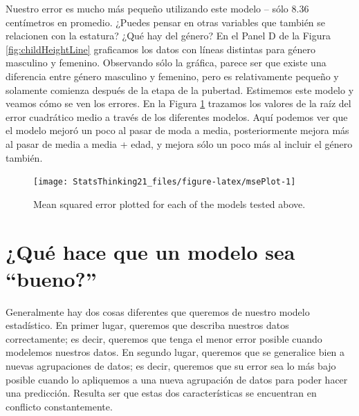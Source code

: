 \documentclass[
  12pt,
]{book}
\begin{document}
Nuestro error es mucho más pequeño utilizando este modelo -- sólo 8.36 centímetros en promedio. ¿Puedes pensar en otras variables que también se relacionen con la estatura? ¿Qué hay del género? En el Panel D de la Figura \ref{fig:childHeightLine} graficamos los datos con líneas distintas para género masculino y femenino. Observando sólo la gráfica, parece ser que existe una diferencia entre género masculino y femenino, pero es relativamente pequeño y solamente comienza después de la etapa de la pubertad. Estimemos este modelo y veamos cómo se ven los errores. En la Figura \ref{fig:msePlot} trazamos los valores de la raíz del error cuadrático medio a través de los diferentes modelos. Aquí podemos ver que el modelo mejoró un poco al pasar de moda a media, posteriormente mejora más al pasar de media a media + edad, y mejora sólo un poco más al incluir el género también.

\begin{figure}
\texttt{[image: StatsThinking21\_files/figure-latex/msePlot-1]} \caption{Mean squared error plotted for each of the models tested above.}\label{fig:msePlot}
\end{figure}

\hypertarget{quuxe9-hace-que-un-modelo-sea-bueno}{%
\section{¿Qué hace que un modelo sea ``bueno?''}\label{quuxe9-hace-que-un-modelo-sea-bueno}}

Generalmente hay dos cosas diferentes que queremos de nuestro modelo estadístico. En primer lugar, queremos que describa nuestros datos correctamente; es decir, queremos que tenga el menor error posible cuando modelemos nuestros datos. En segundo lugar, queremos que se generalice bien a nuevas agrupaciones de datos; es decir, queremos que su error sea lo más bajo posible cuando lo apliquemos a una nueva agrupación de datos para poder hacer una predicción. Resulta ser que estas dos características se encuentran en conflicto constantemente.
\end{document}
